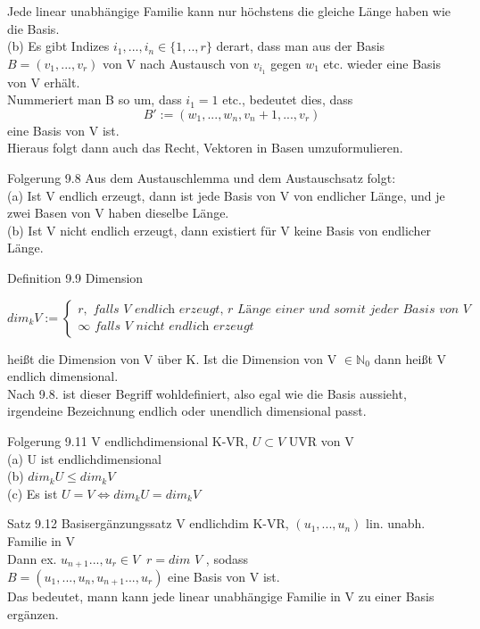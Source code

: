 \documentclass[smallheadings,12pt,a4paper]{scrartcl}
\begin{document}
Jede linear unabhängige Familie kann nur höchstens die gleiche Länge haben wie die Basis. \\

(b) Es gibt Indizes $i_1,...,i_n \in \{1,..,r\}$ derart, dass man aus der Basis $B = (v_1,...,v_r)$ von V nach Austausch von $v_{i_1}$ gegen $w_1$ etc. wieder eine Basis von V erhält. \\
Nummeriert man B so um, dass $i_1 = 1$ etc., bedeutet dies, dass 
$$ B':=(w_1,...,w_n,v_n+1,...,v_r) $$ 
eine Basis von V ist. \\

Hieraus folgt dann auch das Recht, Vektoren in Basen umzuformulieren. \\

\item[Folgerung 9.8]
Aus dem Austauschlemma und dem Austauschsatz folgt: \\

(a) Ist V endlich erzeugt, dann ist jede Basis von V von endlicher Länge, und je zwei Basen von V haben dieselbe Länge. \\
(b) Ist V nicht endlich erzeugt, dann existiert für V keine Basis von endlicher Länge. \\

\newpage

\begin{center}
\item[Definition 9.9 Dimension]
\end{center}

$$\textit{dim}_k V:= \begin{cases} 
r, \textit{      falls V endlich erzeugt, r Länge einer und somit jeder Basis von V} \\
\infty \textit{     falls V nicht endlich erzeugt } 
\end{cases} $$

heißt die Dimension von V über K. Ist die Dimension von V $\in \mathbb{N}_0$ dann heißt V endlich dimensional. \\
Nach 9.8. ist dieser Begriff wohldefiniert, also egal wie die Basis aussieht, irgendeine Bezeichnung endlich oder unendlich dimensional passt. \\

\item[Folgerung 9.11]
V endlichdimensional K-VR, $U \subset V$ UVR von V \\

(a) U ist endlichdimensional \\
(b) $\textit{dim}_k U \leq \textit{dim}_k V $ \\
(c) Es ist $U=V \Leftrightarrow \textit{dim}_k U = \textit{dim}_k V$ \\


\item[Satz 9.12 Basisergänzungssatz ]
V endlichdim K-VR, $(u_1,...,u_n)$ lin. unabh. Familie in V \\
Dann ex. $u_{n+1}...,u_r \in V \; \; r = \textit{dim  }V$ , sodass \\
$B=(u_1,...,u_n,u_{n+1}...,u_r)$ eine Basis von V ist. \\

Das bedeutet, mann kann jede linear unabhängige Familie in V zu einer Basis ergänzen. \\
\end{document}
